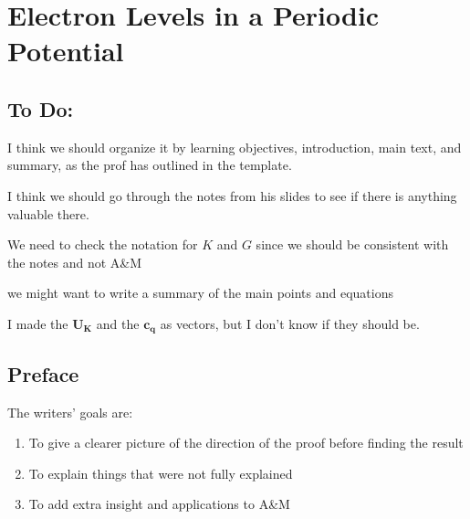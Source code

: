 \chapter{Electron Levels in a Periodic Potential}

\listoftodos

\section{To Do:}
	I think we should organize it by learning objectives, introduction, main text, and summary, as the prof has outlined in the template.

	I think we should go through the notes from his slides to see if there is anything valuable there.

	We need to check the notation for $K$ and $G$ since we should be consistent with the notes and not A\&M

	we might want to write a summary of the main points and equations

	I made the $\mathbf{U_K}$ and the $\mathbf{c_q}$ as vectors, but I don't know if they should be.


\section{Preface}

	The writers' goals are:
	\begin{enumerate}
		\item To give a clearer picture of the direction of the proof before finding the result
		\item To explain things that were not fully explained
		\item To add extra insight and applications to A\&M
	\end{enumerate}


